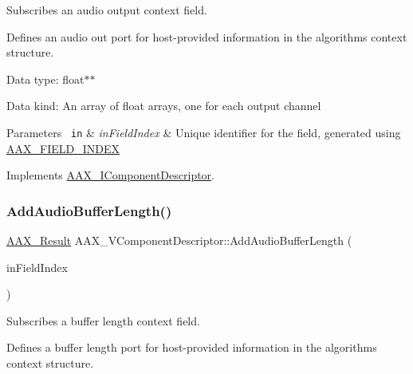 Subscribes an audio output context field. 

Defines an audio out port for host-\/provided information in the algorithm\textquotesingle{}s context structure.


\begin{DoxyItemize}
\item Data type\+: float$\ast$$\ast$
\item Data kind\+: An array of float arrays, one for each output channel
\end{DoxyItemize}


\begin{DoxyParams}[1]{Parameters}
\mbox{\texttt{ in}}  & {\em in\+Field\+Index} & Unique identifier for the field, generated using \mbox{\hyperlink{a00392_acf807247ecd6e5899dc9dc31644e9a1d}{A\+A\+X\+\_\+\+F\+I\+E\+L\+D\+\_\+\+I\+N\+D\+EX}} \\
\hline
\end{DoxyParams}


Implements \mbox{\hyperlink{a01781_afea50c52b3c2e68eef2857b75859a954}{A\+A\+X\+\_\+\+I\+Component\+Descriptor}}.

\mbox{\label{a01901_ae7bc664b4079cb46ca268e983821461d}} 
\subsubsection{\texorpdfstring{AddAudioBufferLength()}{AddAudioBufferLength()}}
{\footnotesize\ttfamily \mbox{\hyperlink{a00392_a4d8f69a697df7f70c3a8e9b8ee130d2f}{A\+A\+X\+\_\+\+Result}} A\+A\+X\+\_\+\+V\+Component\+Descriptor\+::\+Add\+Audio\+Buffer\+Length (\begin{DoxyParamCaption}\item[{\mbox{\hyperlink{a00392_ae807f8986143820cfb5d6da32165c9c7}{A\+A\+X\+\_\+\+C\+Field\+Index}}}]{in\+Field\+Index }\end{DoxyParamCaption})\hspace{0.3cm}{\ttfamily [virtual]}}



Subscribes a buffer length context field. 

Defines a buffer length port for host-\/provided information in the algorithm\textquotesingle{}s context structure.


